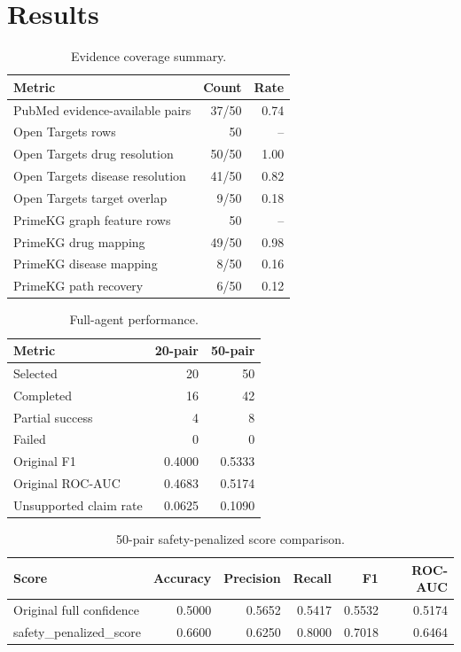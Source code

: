 \documentclass[11pt]{article}
\begin{document}
\section{Results}
\begin{table}[htbp]
\centering
\caption{Evidence coverage summary.}
\begin{tabular}{lrr}
\toprule
Metric & Count & Rate \\
\midrule
PubMed evidence-available pairs & 37/50 & 0.74 \\
Open Targets rows & 50 & -- \\
Open Targets drug resolution & 50/50 & 1.00 \\
Open Targets disease resolution & 41/50 & 0.82 \\
Open Targets target overlap & 9/50 & 0.18 \\
PrimeKG graph feature rows & 50 & -- \\
PrimeKG drug mapping & 49/50 & 0.98 \\
PrimeKG disease mapping & 8/50 & 0.16 \\
PrimeKG path recovery & 6/50 & 0.12 \\
\bottomrule
\end{tabular}
\end{table}

\begin{table}[htbp]
\centering
\caption{Full-agent performance.}
\begin{tabular}{lrr}
\toprule
Metric & 20-pair & 50-pair \\
\midrule
Selected & 20 & 50 \\
Completed & 16 & 42 \\
Partial success & 4 & 8 \\
Failed & 0 & 0 \\
Original F1 & 0.4000 & 0.5333 \\
Original ROC-AUC & 0.4683 & 0.5174 \\
Unsupported claim rate & 0.0625 & 0.1090 \\
\bottomrule
\end{tabular}
\end{table}

\begin{table}[htbp]
\centering
\caption{50-pair safety-penalized score comparison.}
\begin{tabular}{lrrrrr}
\toprule
Score & Accuracy & Precision & Recall & F1 & ROC-AUC \\
\midrule
Original full confidence & 0.5000 & 0.5652 & 0.5417 & 0.5532 & 0.5174 \\
safety\_penalized\_score & 0.6600 & 0.6250 & 0.8000 & 0.7018 & 0.6464 \\
\bottomrule
\end{tabular}
\end{table}
\end{document}
